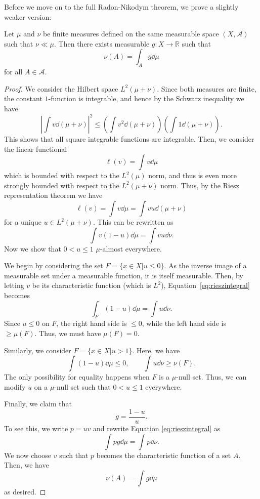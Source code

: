 \documentclass[twoside,symmetric, openany, 12pt]{./tuftebook}
\theoremstyle{definition}
\theoremstyle{definition}
\theoremstyle{definition}
\newcommand{\R}{\mathbb{R}}
\begin{document}
Before we move on to the full Radon-Nikodym theorem, we prove a slightly weaker version:
\begin{Theorem}
	Let $\mu$ and $\nu$ be finite measures defined on the same measurable space $(X, \mathcal{A})$ such that $\nu \ll \mu$. Then there exists measurable $g:X \to \R$ such that
	\[\nu(A) = \int_A g \dd{\mu}\]
	for all $A\in \mathcal{A}$.
\end{Theorem}
\begin{proof}
	We consider the Hilbert space $L^2(\mu+\nu)$. Since both measures are finite, the constant $1$-function is integrable, and hence by the Schwarz inequality we have
	\[\left|\int v \dd{(\mu+\nu)}\right|^2 \le \left(\int v^2 \dd{(\mu+\nu)}\right) \left(\int 1\dd{(\mu+\nu)}\right).\]
	This shows that all square integrable functions are integrable. Then, we consider the linear functional
	\[\ell(v) = \int v \dd{\mu}\]
	which is bounded with respect to the $L^2(\mu)$ norm, and thus is even more strongly bounded with respect to the $L^2(\mu+\nu)$ norm. Thus, by the Riesz representation theorem we have
	\[\ell(v) = \int v\dd{\mu} = \int vu \dd{(\mu+\nu)}\]
	for a unique $u\in L^2(\mu+\nu)$. This can be rewritten as
	\begin{equation}\label{eq:rieszintegral}
		\int v(1-u)\dd{\mu}=\int vu \dd{\nu}.
		\end{equation}
	Now we show that $0 < u \le 1$ $\mu$-almost everywhere.
	
	We begin by considering the set $F = \{x\in X|u \le 0\}$. As the inverse image of a measurable set under a measurable function, it is itself measurable. Then, by letting $v$ be its characteristic function (which is $L^2$), Equation~\eqref{eq:rieszintegral} becomes
	\[\int_F (1-u)\dd{\mu} = \int u \dd{\nu}.\]
	Since $u\le 0$ on $F$, the right hand side is $\le 0$, while the left hand side is $\ge \mu(F)$. Thus, we must have $\mu(F)=0$.
	
	Similarly, we consider $F=\{x \in X|u > 1\}$. Here, we have
	\[\int (1-u)\dd{\mu} \le 0, \qquad \int u \dd{\nu} \ge \nu(F).\]
	The only possibility for equality happens when $F$ is a $\mu$-null set. Thus, we can modify $u$ on a $\mu$-null set such that $0< u \le 1$ everywhere.
	
	Finally, we claim that
	\[g = \frac{1-u}{u}.\]
	To see this, we write $p = uv$ and rewrite Equation \eqref{eq:rieszintegral} as
	\[\int pg \dd{\mu} = \int p \dd{\nu}.\]
	We now choose $v$ such that $p$ becomes the characteristic function of a set $A$. Then, we have
	\[\nu(A) = \int g \dd{\mu}\]
	as desired.
\end{proof}
\end{document}
